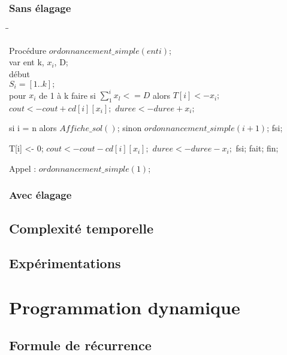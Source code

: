 \documentclass[a4paper, titlepage]{article}
\begin{document}
		\subsubsection{Sans élagage}

			\begin{tabbing}

			\hspace{1cm}\=\hspace{1cm}\=\kill %

			Procédure $ordonnancement\_simple(ent i)$; \\
			var ent k, $x_{i}$, D; \\
			début \\
				\> $S_{i} = [1..k];$ \\
				\> pour $x_{i}$ de 1 à k faire
					\>\> si $\sum_{1}^{i} x_{l} <= D$ alors
						\>\>\> $T[i] <- x_{i};$
						\>\>\> $cout <- cout + cd[i][x_{i}];$
						\>\>\> $duree <- duree + x_{i};$

						\>\>\> si i = n alors $Affiche\_sol()$;
						\>\>\> sinon
							\>\>\> $ordonnancement\_simple(i+1)$;
						\>\>\> fsi;

						\>\>\> T[i] <- 0;
						\>\>\> $cout <- cout - cd[i][x_{i}];$
						\>\>\> $duree <- duree - x_{i};	$
					\>\> fsi;
				\> fait;
			fin;

			\end{tabbing}

			\noindent
			Appel : $ordonnancement\_simple(1)$;

		\subsubsection{Avec élagage}

	\subsection{Complexité temporelle}

	\subsection{Expérimentations}

\section{Programmation dynamique}

	\subsection{Formule de récurrence}
\end{document}
